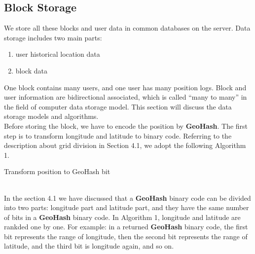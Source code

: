 \documentclass[sigplan,screen]{acmart}
\begin{document}
\subsection{Block Storage}
We store all these blocks and user data in common databases on the server.
Data storage includes two main parts:
\begin{enumerate}
	\item user historical location data
	\item block data
\end{enumerate}
One block contains many users, and one user has many position logs.
Block and user information are bidirectional associated, which is called “many to many” in the field of computer data storage model.
This section will discuss the data storage models and algorithms.
\\
Before storing the block, we have to encode the position by \textbf{GeoHash}.
The first step is to transform longitude and latitude to binary code.
Referring to the description about grid division in Section 4.1, we adopt the following Algorithm 1.
\\
\begin{algorithm}[htb]
	\caption{Transform position to GeoHash bit}
	\begin{algorithmic}[1]
		\Else
		\EndIf
		\Else
		\EndIf
		\EndWhile
		\EndFunction
	\end{algorithmic}
\end{algorithm}
\\
In the section 4.1 we have discussed that a \textbf{GeoHash} binary code can be divided into two parts: longitude part and latitude part, and they have the same number of bits in a \textbf{GeoHash} binary code.
In Algorithm 1, longitude and latitude are rankded one by one.
For example: in a returned \textbf{GeoHash} binary code, the first bit represents the range of longitude, then the second bit represents the range of latitude, and the third bit is longitude again, and so on.
\end{document}
